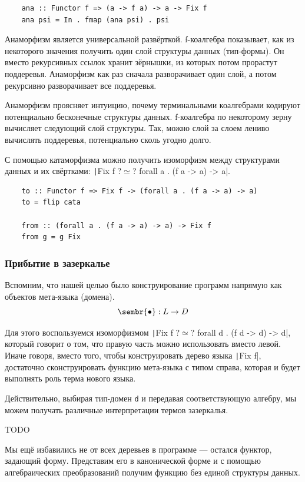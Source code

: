 \begin{verbatim}
    ana :: Functor f => (a -> f a) -> a -> Fix f
    ana psi = In . fmap (ana psi) . psi
\end{verbatim}

Анаморфизм является универсальной развёрткой.
f-коалгебра показывает, как из некоторого значения получить один слой структуры данных (тип-формы).
Он вместо рекурсивных ссылок хранит зёрнышки, из которых потом прорастут поддеревья.
Анаморфизм как раз сначала разворачивает один слой, а потом рекурсивно разворачивает все поддеревья.

Анаморфизм проясняет интуицию, почему терминальными коалгебрами кодируют потенциально бесконечные структуры данных.
f-коалгебра по некоторому зерну вычисляет следующий слой структуры.
Так, можно слой за слоем лениво вычислять поддеревья, потенциально сколь угодно долго.

С помощью катаморфизма можно получить изоморфизм между структурами данных и их свёртками:
\texttt|Fix f ?$\simeq$? forall a . (f a -> a) -> a|.
\begin{verbatim}
    to :: Functor f => Fix f -> (forall a . (f a -> a) -> a)
    to = flip cata

    from :: (forall a . (f a -> a) -> a) -> Fix f
    from g = g Fix
\end{verbatim}


\subsubsection{Прибытие в зазеркалье}

Вспомним, что нашей целью было конструирование программ напрямую как объектов мета-языка (домена).
\[
    \sembr{\bullet} : L \to D
\]

Для этого воспользуемся изоморфизмом
\texttt|Fix f ?$\simeq$? forall d . (f d -> d) -> d|, который говорит о том, что правую часть можно использовать вместо левой.
Иначе говоря, вместо того, чтобы конструировать дерево языка \texttt|Fix f|, достаточно сконструировать функцию мета-языка с типом справа, которая и будет выполнять роль терма нового языка.

Действительно, выбирая тип-домен \texttt{d} и передавая соответствующую алгебру, мы можем получать различные интерпретации термов зазеркалья.

TODO %

Мы ещё избавились не от всех деревьев в программе --- остался функтор, задающий форму.
Представим его в канонической форме и с помощью алгебраических преобразований получим функцию без единой структуры данных.


